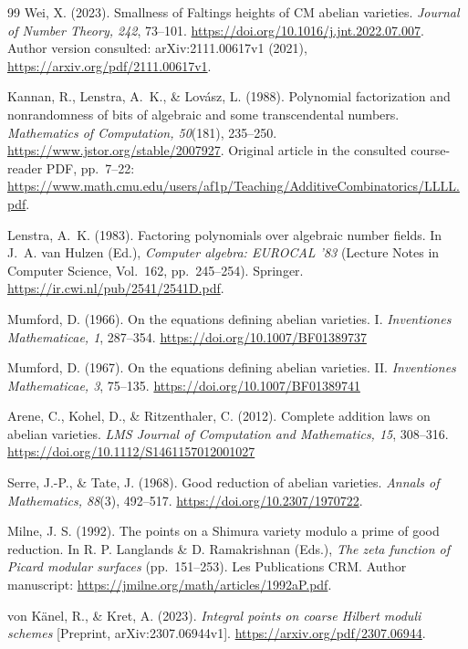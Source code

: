 \documentclass[11pt]{article}
\theoremstyle{definition}
\theoremstyle{remark}
\begin{document}
\begin{thebibliography}{99}
Wei, X. (2023). Smallness of Faltings heights of CM abelian varieties.
\emph{Journal of Number Theory, 242}, 73--101.
\url{https://doi.org/10.1016/j.jnt.2022.07.007}.
Author version consulted: arXiv:2111.00617v1 (2021),
\url{https://arxiv.org/pdf/2111.00617v1}.

Kannan, R., Lenstra, A.~K., \& Lov\'asz, L. (1988).
Polynomial factorization and nonrandomness of bits of algebraic and
some transcendental numbers.
\emph{Mathematics of Computation, 50}(181), 235--250.
\url{https://www.jstor.org/stable/2007927}.
Original article in the consulted course-reader PDF, pp.~7--22:
\url{https://www.math.cmu.edu/users/af1p/Teaching/AdditiveCombinatorics/LLLL.pdf}.

Lenstra, A.~K. (1983).
Factoring polynomials over algebraic number fields.
In J.~A. van Hulzen (Ed.), \emph{Computer algebra: EUROCAL '83}
(Lecture Notes in Computer Science, Vol.~162, pp.~245--254). Springer.
\url{https://ir.cwi.nl/pub/2541/2541D.pdf}.

Mumford, D. (1966). On the equations defining abelian varieties. I.
\emph{Inventiones Mathematicae, 1}, 287--354.
\url{https://doi.org/10.1007/BF01389737}

Mumford, D. (1967). On the equations defining abelian varieties. II.
\emph{Inventiones Mathematicae, 3}, 75--135.
\url{https://doi.org/10.1007/BF01389741}

Arene, C., Kohel, D., \& Ritzenthaler, C. (2012).
Complete addition laws on abelian varieties.
\emph{LMS Journal of Computation and Mathematics, 15}, 308--316.
\url{https://doi.org/10.1112/S1461157012001027}


Serre, J.-P., \& Tate, J. (1968). Good reduction of abelian varieties.
\emph{Annals of Mathematics, 88}(3), 492--517.
\url{https://doi.org/10.2307/1970722}.

Milne, J. S. (1992). The points on a Shimura variety modulo a prime of
good reduction. In R. P. Langlands \& D. Ramakrishnan (Eds.),
\emph{The zeta function of Picard modular surfaces} (pp.~151--253).
Les Publications CRM. Author manuscript:
\url{https://jmilne.org/math/articles/1992aP.pdf}.


von K\"anel, R., \& Kret, A. (2023).
\emph{Integral points on coarse Hilbert moduli schemes}
[Preprint, arXiv:2307.06944v1].
\url{https://arxiv.org/pdf/2307.06944}.



\end{thebibliography}
\end{document}
